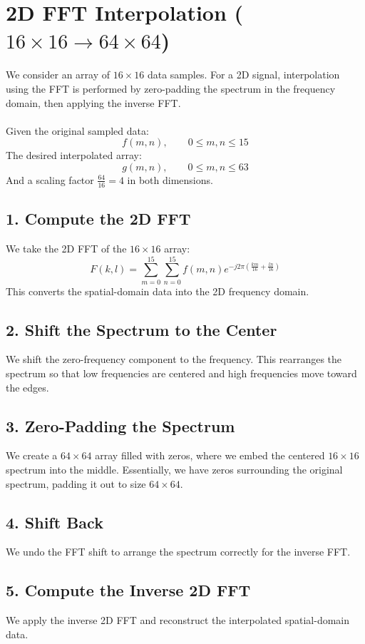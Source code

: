 \documentclass{article}
\begin{document}
\section{2D FFT Interpolation (\(16\times16 \rightarrow 64\times 64\))}
We consider an array of \(16 \times 16\) data samples. For a 2D signal, interpolation using the FFT is performed by zero-padding the spectrum in the frequency domain, then applying the inverse FFT.
\\
\\
Given the original sampled data:
\[
f(m,n), \qquad 0\leq m, n\leq 15
\]
The desired interpolated array:
\[
g(m,n), \qquad 0\leq m, n\leq 63 
\]
And a scaling factor \(\frac{64}{16}=4\) in both dimensions.

\subsection*{1. Compute the 2D FFT}
We take the 2D FFT of the \(16 \times 16\) array:
\[
F(k,l) = \sum_{m=0}^{15} \sum_{n=0}^{15} f(m,n)e^{-j2\pi(\frac{km}{16} + \frac{ln}{16})}
\]
This converts the spatial-domain data into the 2D frequency domain.

\subsection*{2. Shift the Spectrum to the Center}
We shift the zero-frequency component to the frequency. This rearranges the spectrum so that low frequencies are centered and high frequencies move toward the edges.

\subsection*{3. Zero-Padding the Spectrum}
We create a \(64 \times 64\) array filled with zeros, where we embed the centered \(16\times 16\) spectrum into the middle. Essentially, we have zeros surrounding the original spectrum, padding it out to size \(64 \times 64\).

\subsection*{4. Shift Back}
We undo the FFT shift to arrange the spectrum correctly for the inverse FFT.

\subsection*{5. Compute the Inverse 2D FFT}
We apply the inverse 2D FFT and reconstruct the interpolated spatial-domain data.
\end{document}
